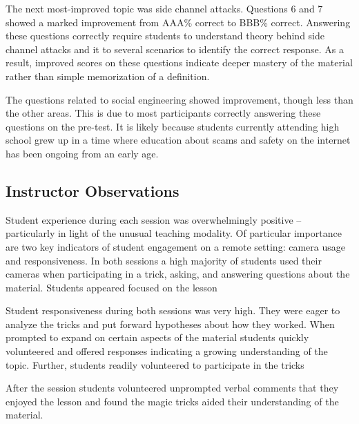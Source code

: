 The next most-improved topic was side channel attacks.  Questions 6 and 7
showed a marked improvement from AAA\% correct to BBB\% correct.  Answering
these questions correctly require students to understand theory behind side
channel attacks and it to several scenarios to identify the correct
response.  As a result,  improved scores on these questions indicate deeper
mastery of the material rather than simple memorization of a definition.

The questions related to social engineering showed improvement, though less
than the other areas.  This is due to most participants correctly answering
these questions on the pre-test.  It is likely because students currently
attending high school grew up in a time where education about scams and
safety on the internet has been ongoing from an early age.


\subsection{Instructor Observations}

Student experience during each session was overwhelmingly positive --
particularly in light of the unusual teaching modality.
Of particular importance are two key indicators
of student engagement on a remote setting: camera usage and
responsiveness.  In both sessions a high majority of students used their
cameras when participating in a trick, asking, and answering questions
about the material.  Students appeared focused on the lesson

Student responsiveness during both sessions was very high.
They were eager to analyze the
tricks and put forward hypotheses about how they worked.
When prompted to
expand on certain aspects of the material students quickly volunteered and
offered responses indicating a growing understanding of the topic.
Further, students readily volunteered to participate in the tricks 

After the session students volunteered unprompted verbal comments that they enjoyed the
lesson and found the magic tricks aided their understanding of the
material.  
